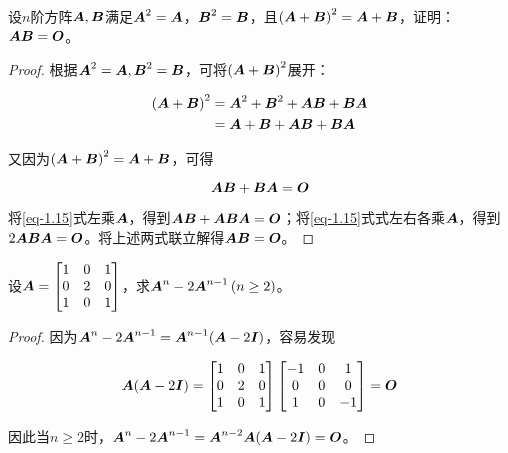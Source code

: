 \begin{problem}
设\(n\)阶方阵\(\mata,\matb\)满足\(\mata^2=\mata\)，\(\matb^2=\matb\)，且\(\mypar{\mata+\matb}^2=\mata+\matb\)，证明：\(\mata\matb=\mato\)。
\end{problem}
\begin{proof}
    根据\(\mata^2=\mata,\matb^2=\matb\)，可将\(\mypar{\mata+\matb}^2\)展开：

    \begin{align*}
        \mypar{\mata+\matb}^2 & =\mata^2+\matb^2+\mata\matb+\matb\mata \\
                              & =\mata+\matb+\mata\matb+\matb\mata
    \end{align*}

    又因为\(\mypar{\mata+\matb}^2=\mata+\matb\)，可得

    \begin{equation}\label{eq-1.15}
        \mata\matb+\matb\mata=\mato
    \end{equation}

    将\eqref{eq-1.15}式左乘\(\mata\)，得到\(\mata\matb+\mata\matb\mata=\mato\)；将\eqref{eq-1.15}式式左右各乘\(\mata\)，得到\(2\mata\matb\mata=\mato\)。将上述两式联立解得\(\mata\matb=\mato\)。
\end{proof}

\begin{problem}
设\(\mata=\begin{bmatrix}1&0&1\\0&2&0\\1&0&1\end{bmatrix}\)，求\(\mata^n-2\mata^{n-1}\mypar{n\ge2}\)。
\end{problem}
\begin{proof}
    因为\(\mata^n-2\mata^{n-1}=\mata^{n-1}(\mata-2\mati)\)，容易发现

    \begin{equation*}
        \mata(\mata-2\mati)=
        \begin{bmatrix}
            1 & 0 & 1 \\0&2&0\\1&0&1
        \end{bmatrix}
        \begin{bmatrix}
            -1 & 0 & 1 \\0&0&0\\1&0&-1
        \end{bmatrix}=\mato
    \end{equation*}

    因此当\(n\ge2\)时，\(\mata^n-2\mata^{n-1}=\mata^{n-2}\mata(\mata-2\mati)=\mato\)。
\end{proof}

